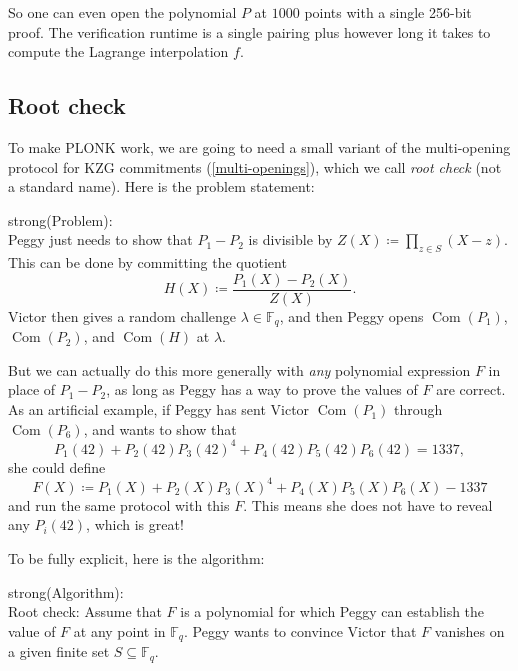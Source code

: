 So one can even open the polynomial \(P\) at \(1000\) points with a
single 256-bit proof. The verification runtime is a single pairing plus
however long it takes to compute the Lagrange interpolation \(f\).

\subsection{Root check}

To make PLONK work, we are going to need a small variant of the
multi-opening protocol for KZG commitments
(\hyperref[multi-openings]{{[}multi-openings{]}}), which we call
\emph{root check} (not a standard name). Here is the problem statement:

strong(Problem):\\

Peggy just needs to show that \(P_{1} - P_{2}\) is divisible by
\(Z(X) ≔ \prod_{z \in S}(X - z)\). This can be done by committing the
quotient \[H(X) ≔ \frac{P_{1}(X) - P_{2}(X)}{Z(X)}.\] Victor then gives
a random challenge \(\lambda \in {\mathbb{F}}_{q}\), and then Peggy
opens \(\operatorname{Com}(P_{1})\), \(\operatorname{Com}(P_{2})\), and
\(\operatorname{Com}(H)\) at \(\lambda\).

But we can actually do this more generally with \emph{any} polynomial
expression \(F\) in place of \(P_{1} - P_{2}\), as long as Peggy has a
way to prove the values of \(F\) are correct. As an artificial example,
if Peggy has sent Victor \(\operatorname{Com}(P_{1})\) through
\(\operatorname{Com}(P_{6})\), and wants to show that
\[P_{1}(42) + P_{2}(42)P_{3}(42)^{4} + P_{4}(42)P_{5}(42)P_{6}(42) = 1337,\]
she could define
\[F(X) ≔ P_{1}(X) + P_{2}(X)P_{3}(X)^{4} + P_{4}(X)P_{5}(X)P_{6}(X) - 1337\]
and run the same protocol with this \(F\). This means she does not have
to reveal any \(P_{i}(42)\), which is great!

To be fully explicit, here is the algorithm:

strong(Algorithm):\\
Root check: Assume that \(F\) is a polynomial for which Peggy can
establish the value of \(F\) at any point in \({\mathbb{F}}_{q}\). Peggy
wants to convince Victor that \(F\) vanishes on a given finite set
\(S \subseteq {\mathbb{F}}_{q}\).

